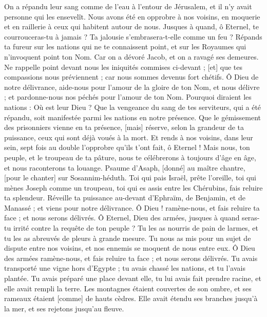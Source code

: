 \begin{multicols}{2}
On a répandu leur sang comme de l'eau à l'entour de Jérusalem, et il n'y avait personne qui les ensevelît.
Nous avons été en opprobre à nos voisins, en moquerie et en raillerie à ceux qui habitent autour de nous.
Jusques à quand, ô Eternel, te courrouceras-tu à jamais ? Ta jalousie s'embrasera-t-elle comme un feu ?
Répands ta fureur sur les nations qui ne te connaissent point, et sur les Royaumes qui n'invoquent point ton Nom.
Car on a dévoré Jacob, et on a ravagé ses demeures.
Ne rappelle point devant nous les iniquités commises ci-devant ; [et] que tes compassions nous préviennent ; car nous sommes devenus fort chétifs.
Ô Dieu de notre délivrance, aide-nous pour l'amour de la gloire de ton Nom, et nous délivre ; et pardonne-nous nos péchés pour l'amour de ton Nom.
Pourquoi diraient les nations : Où est leur Dieu ? Que la vengeance du sang de tes serviteurs, qui a été répandu, soit manifestée parmi les nations en notre présence.
Que le gémissement des prisonniers vienne en ta présence, [mais] réserve, selon la grandeur de ta puissance, ceux qui sont déjà voués à la mort.
Et rends à nos voisins, dans leur sein, sept fois au double l'opprobre qu'ils t'ont fait, ô Eternel !
Mais nous, ton peuple, et le troupeau de ta pâture, nous te célébrerons à toujours d'âge en âge, et nous raconterons ta louange.
\VerseOne{}Psaume d'Asaph, [donné] au maître chantre, [pour le chanter] sur Sosannim-héduth. Toi qui pais Israël, prête l'oreille, toi qui mènes Joseph comme un troupeau, toi qui es assis entre les Chérubins, fais reluire ta splendeur.
Réveille ta puissance au-devant d'Ephraïm, de Benjamin, et de Manassé ; et viens pour notre délivrance.
Ô Dieu ! ramène-nous, et fais reluire ta face ; et nous serons délivrés.
Ô Eternel, Dieu des armées, jusques à quand seras-tu irrité contre la requête de ton peuple ?
Tu les as nourris de pain de larmes, et tu les as abreuvés de pleurs à grande mesure.
Tu nous as mis pour un sujet de dispute entre nos voisins, et nos ennemis se moquent de nous entre eux.
Ô Dieu des armées ramène-nous, et fais reluire ta face ; et nous serons délivrés.
Tu avais transporté une vigne hors d'Egypte ; tu avais chassé les nations, et tu l'avais plantée.
Tu avais préparé une place devant elle, tu lui avais fait prendre racine, et elle avait rempli la terre.
Les montagnes étaient couvertes de son ombre, et ses rameaux étaient [comme] de hauts cèdres.
Elle avait étendu ses branches jusqu'à la mer, et ses rejetons jusqu'au fleuve.

\end{multicols}
